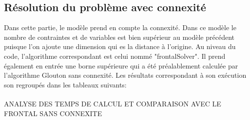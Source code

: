 \documentclass[a4paper, 11pt]{article} %
\begin{document}
\begin{comment}
  $20\_25\_1$ &  & &  \\ \hline 
  $20\_25\_2$ &  & &  \\ \hline
  $20\_25\_3$ &  & &  \\ \hline
  $20\_25\_4$ &  & &  \\ \hline
  $20\_25\_5$ &  & &  \\ \hline
  $20\_25\_6$ &  & &  \\ \hline
  $20\_25\_7$ &  & &  \\ \hline
  $20\_25\_8$ &  & &  \\ \hline
  $20\_25\_9$ &  & &  \\ \hline
  $20\_25\_10$ &  & &  \\ \hline
  
  $25\_30\_1$ &  & &  \\ \hline
  $25\_30\_2$ &  & &  \\ \hline 
  $25\_30\_3$ &  & &  \\ \hline 
  $25\_30\_4$ &  & &  \\ \hline 
  $25\_30\_5$ &  & &  \\ \hline 
  $25\_30\_6$ &  & &  \\ \hline 
  $25\_30\_7$ &  & &  \\ \hline 
  $25\_30\_8$ &  & &  \\ \hline 
  $25\_30\_9$ &  & &  \\ \hline 
  $25\_30\_10$ &  & &  \\ \hline 
 
\end{tabular}
\end{center}
\end{comment}


\subsection{Résolution du problème avec connexité}

Dans cette partie, le modèle prend en compte la connexité. Dans ce modèle le nombre de contraintes et de variables est bien supérieur au modèle précédent puisque l'on ajoute une dimension qui es la distance à l'origine. Au niveau du code, l'algorithme correspondant est celui nommé "frontalSolver". Il prend également en entrée une borne supérieure qui a été préalablement calculée par l'algorithme Glouton sans connexité. Les résultats correspondant à son exécution son regroupés dans les tableaux suivants:


\paragraph*{}
ANALYSE DES TEMPS DE CALCUL ET COMPARAISON AVEC LE FRONTAL SANS CONNEXITE
\end{document}
